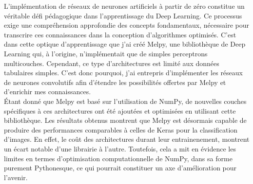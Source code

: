 L’implémentation de réseaux de neurones artificiels à partir de zéro constitue un véritable défi 
pédagogique dans l’apprentissage du Deep Learning. Ce processus exige une compréhension approfondie 
des concepts fondamentaux, nécessaire pour transcrire ces connaissances dans la conception d’algorithmes 
optimisés. C’est dans cette optique d'apprentissage que j’ai créé Melpy, une bibliothèque 
de Deep Learning qui, à l’origine, n’implémentait que de simples perceptrons multicouches. Cependant, 
ce type d’architectures est limité aux données tabulaires simples. C'est donc pourquoi, j’ai entrepris d’implémenter 
les réseaux de neurones convolutifs afin d’étendre les possibilités offertes par Melpy et d’enrichir 
mes connaissances. \\


Étant donné que Melpy est basé sur l'utilisation de NumPy, de nouvelles couches spécifiques à ces 
architectures ont été ajoutées et optimisées en utilisant cette bibliothèque. Les résultats obtenus 
montrent que Melpy est désormais capable de produire des performances comparables à celles de Keras 
pour la classification d’images. En effet, le coût des architectures durant leur entrainenement, montrent
un écart notable d'une librairie à l'autre. Toutefois, cela a mit en évidence les limites en termes d’optimisation 
computationnelle de NumPy, dans sa forme purement Pythonesque, ce qui pourrait constituer un axe d’amélioration 
pour l’avenir.